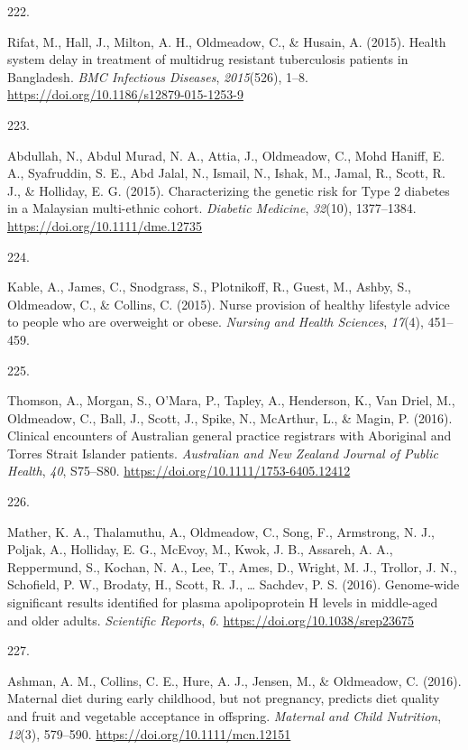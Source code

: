 \documentclass[11pt, a4paper]{awesome-cv}
\newlength{\csllabelwidth}
\newcommand{\CSLLeftMargin}[1]{\parbox[t]{\csllabelwidth}{#1}}
\newcommand{\CSLRightInline}[1]{\parbox[t]{\linewidth - \csllabelwidth}{#1}}
\begin{document}
\leavevmode\hypertarget{ref-rifat_health_2015}{}%
\CSLLeftMargin{222. }
\CSLRightInline{Rifat, M., Hall, J., Milton, A. H., Oldmeadow, C., \&
Husain, A. (2015). Health system delay in treatment of multidrug
resistant tuberculosis patients in Bangladesh. \emph{BMC Infectious
Diseases}, \emph{2015}(526), 1--8.
\url{https://doi.org/10.1186/s12879-015-1253-9}}

\leavevmode\hypertarget{ref-abdullah_characterizing_2015}{}%
\CSLLeftMargin{223. }
\CSLRightInline{Abdullah, N., Abdul Murad, N. A., Attia, J., Oldmeadow,
C., Mohd Haniff, E. A., Syafruddin, S. E., Abd Jalal, N., Ismail, N.,
Ishak, M., Jamal, R., Scott, R. J., \& Holliday, E. G. (2015).
Characterizing the genetic risk for Type 2 diabetes in a Malaysian
multi-ethnic cohort. \emph{Diabetic Medicine}, \emph{32}(10),
1377--1384. \url{https://doi.org/10.1111/dme.12735}}

\leavevmode\hypertarget{ref-kable_nurse_2015}{}%
\CSLLeftMargin{224. }
\CSLRightInline{Kable, A., James, C., Snodgrass, S., Plotnikoff, R.,
Guest, M., Ashby, S., Oldmeadow, C., \& Collins, C. (2015). Nurse
provision of healthy lifestyle advice to people who are overweight or
obese. \emph{Nursing and Health Sciences}, \emph{17}(4), 451--459.}

\leavevmode\hypertarget{ref-thomson_clinical_2016}{}%
\CSLLeftMargin{225. }
\CSLRightInline{Thomson, A., Morgan, S., O'Mara, P., Tapley, A.,
Henderson, K., Van Driel, M., Oldmeadow, C., Ball, J., Scott, J., Spike,
N., McArthur, L., \& Magin, P. (2016). Clinical encounters of Australian
general practice registrars with Aboriginal and Torres Strait Islander
patients. \emph{Australian and New Zealand Journal of Public Health},
\emph{40}, S75--S80. \url{https://doi.org/10.1111/1753-6405.12412}}

\leavevmode\hypertarget{ref-mather_genome-wide_2016}{}%
\CSLLeftMargin{226. }
\CSLRightInline{Mather, K. A., Thalamuthu, A., Oldmeadow, C., Song, F.,
Armstrong, N. J., Poljak, A., Holliday, E. G., McEvoy, M., Kwok, J. B.,
Assareh, A. A., Reppermund, S., Kochan, N. A., Lee, T., Ames, D.,
Wright, M. J., Trollor, J. N., Schofield, P. W., Brodaty, H., Scott, R.
J., \ldots{} Sachdev, P. S. (2016). Genome-wide significant results
identified for plasma apolipoprotein H levels in middle-aged and older
adults. \emph{Scientific Reports}, \emph{6}.
\url{https://doi.org/10.1038/srep23675}}

\leavevmode\hypertarget{ref-ashman_maternal_2016}{}%
\CSLLeftMargin{227. }
\CSLRightInline{Ashman, A. M., Collins, C. E., Hure, A. J., Jensen, M.,
\& Oldmeadow, C. (2016). Maternal diet during early childhood, but not
pregnancy, predicts diet quality and fruit and vegetable acceptance in
offspring. \emph{Maternal and Child Nutrition}, \emph{12}(3), 579--590.
\url{https://doi.org/10.1111/mcn.12151}}
\end{document}
